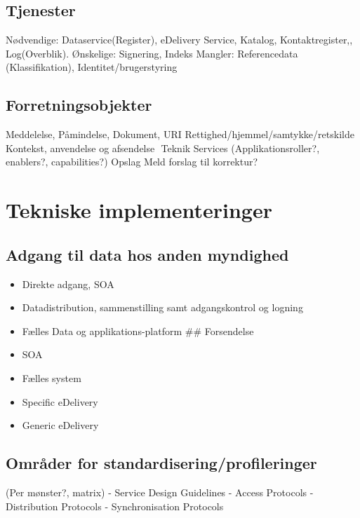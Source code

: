 \subsection{Tjenester}\label{tjenester}

Nødvendige: Dataservice(Register), eDelivery Service, Katalog,
Kontaktregister,, Log(Overblik). Ønskelige: Signering, Indeks Mangler:
Referencedata (Klassifikation), Identitet/brugerstyring

\subsection{Forretningsobjekter}\label{forretningsobjekter}

Meddelelse, Påmindelse, Dokument, URI
Rettighed/hjemmel/samtykke/retskilde Kontekst, anvendelse og afsendelse 
Teknik Services (Applikationsroller?, enablers?, capabilities?) Opslag
Meld forslag til korrektur?

\section{Tekniske implementeringer}\label{tekniske-implementeringer}

\subsection{Adgang til data hos anden
myndighed}\label{adgang-til-data-hos-anden-myndighed}

\begin{itemize}
\tightlist
\item
  Direkte adgang, SOA
\item
  Datadistribution, sammenstilling samt adgangskontrol og logning
\item
  Fælles Data og applikations-platform \#\# Forsendelse
\item
  SOA
\item
  Fælles system
\item
  Specific eDelivery
\item
  Generic eDelivery
\end{itemize}

\subsection{Områder for
standardisering/profileringer}\label{omruxe5der-for-standardiseringprofileringer}

(Per mønster?, matrix) - Service Design Guidelines - Access Protocols -
Distribution Protocols - Synchronisation Protocols

